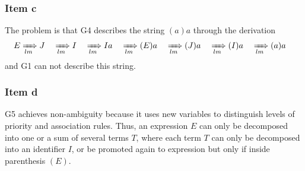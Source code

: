 \documentclass[docid=PA07]{tcom_PA}
\begin{document}
{\subsubsection{Item c}
The problem is that G4 describes the string $(a)a$ through the derivation
\begin{alignat*}{7}
	E
	&\xRightarrow[lm]{} J
	&&\xRightarrow[lm]{} I
	&&\xRightarrow[lm]{} Ia
	&&\xRightarrow[lm]{} (E)a
	&&\xRightarrow[lm]{} (J)a
	&&\xRightarrow[lm]{} (I)a
	&&\xRightarrow[lm]{} (a)a
\end{alignat*}
and G1 can not describe this string.
\subsubsection{Item d}
G5 achieves non-ambiguity because it uses new variables to distinguish levels of priority and association rules. Thus, an expression $E$ can only be decomposed into one or a sum of several terms $T$, where each term $T$ can only be decomposed into an identifier $I$, or be promoted again to expression but only if inside parenthesis $(E)$.
}
\end{document}
